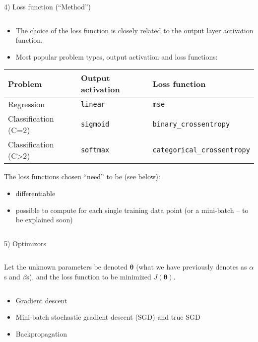\documentclass[10pt,ignorenonframetext,]{beamer}
\providecommand{\tightlist}{%
  \setlength{\itemsep}{0pt}\setlength{\parskip}{0pt}}
\begin{document}
\begin{frame}[fragile]

\begin{block}{4) Loss function (``Method'')}

\(~\)

\begin{itemize}
\item
  The choice of the loss function is closely related to the output layer
  activation function.
\item
  Most popular problem types, output activation and loss functions:
\end{itemize}

\begin{longtable}[]{@{}lll@{}}
\toprule
Problem & Output activation & Loss function\tabularnewline
\midrule
\endhead
Regression & \texttt{linear} & \texttt{mse}\tabularnewline
Classification (C=2) & \texttt{sigmoid} &
\texttt{binary\_crossentropy}\tabularnewline
Classification (C\textgreater{}2) & \texttt{softmax} &
\texttt{categorical\_crossentropy}\tabularnewline
\bottomrule
\end{longtable}

\vspace{2mm}

The loss functions chosen ``need'' to be (see below):

\vspace{1mm}

\begin{itemize}
\tightlist
\item
  differentiable
\item
  possible to compute for each single training data point (or a
  mini-batch -- to be explained soon)
\end{itemize}

\(~\)

\end{block}

\end{frame}

\begin{frame}

\begin{block}{5) Optimizors}

\(~\)

Let the unknown parameters be denoted \({\boldsymbol \theta}\) (what we
have previously denotes as \(\alpha\)s and \(\beta\)s), and the loss
function to be minimized \(J({\boldsymbol \theta})\).

\(~\)

\begin{itemize}
\item
  Gradient descent
\item
  Mini-batch stochastic gradient descent (SGD) and true SGD
\item
  Backpropagation
\end{itemize}

\end{block}

\end{frame}
\end{document}
